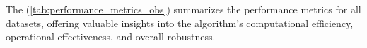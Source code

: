 

\vspace*{6mm}  

The (\autoref{tab:performance_metrics_obs}) summarizes the performance metrics for all datasets, offering valuable insights into the algorithm's computational efficiency, operational effectiveness, and overall robustness.

